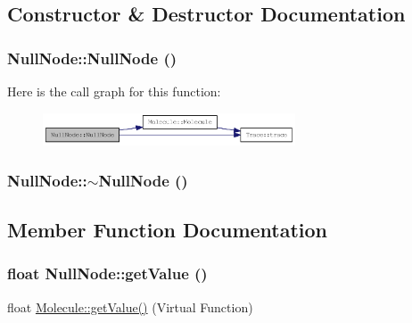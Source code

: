 \subsection{Constructor \& Destructor Documentation}
\hypertarget{classNullNode_ac6fefccfedcc2be3ac11cf4f33a6c113}{
\subsubsection[{NullNode}]{\setlength{\rightskip}{0pt plus 5cm}NullNode::NullNode ()}}
\label{classNullNode_ac6fefccfedcc2be3ac11cf4f33a6c113}


Here is the call graph for this function:\nopagebreak
\begin{figure}[H]
\begin{center}
\leavevmode
\includegraphics[width=212pt]{classNullNode_ac6fefccfedcc2be3ac11cf4f33a6c113_cgraph}
\end{center}
\end{figure}
\hypertarget{classNullNode_ab7852d5e1b9665bb765fd3f10d33ce0b}{
\subsubsection[{$\sim$NullNode}]{\setlength{\rightskip}{0pt plus 5cm}NullNode::$\sim$NullNode ()}}
\label{classNullNode_ab7852d5e1b9665bb765fd3f10d33ce0b}


\subsection{Member Function Documentation}
\hypertarget{classNullNode_ae1cddbf915028ab4f2aebf6879c6a682}{
\subsubsection[{getValue}]{\setlength{\rightskip}{0pt plus 5cm}float NullNode::getValue ()}}
\label{classNullNode_ae1cddbf915028ab4f2aebf6879c6a682}
float \hyperlink{classMolecule_a554ea822918374775d5f52b5d49d8195}{Molecule::getValue()} (Virtual Function)

